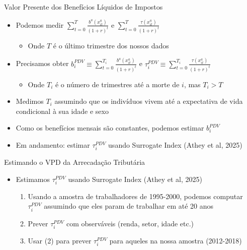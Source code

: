\begin{frame}[label=npv]{Valor Presente dos Benefícios Líquidos de Impostos}
    \begin{itemize}
        \item Podemos medir $\sum_{t=0}^{T} \frac{b^a(x_{it}^a)}{(1+r)^t}$ e $\sum_{t=0}^{T}  \frac{\tau(x_{it}^a)}{(1+r)^t}$
        \begin{itemize}
            \item Onde $T$ é o último trimestre dos nossos dados
        \end{itemize}
        \item Precisamos obter $b_i^{PDV}\equiv  \sum_{t=0}^{T_i} \frac{b^a(x_{it}^a)}{(1+r)^t}$ e $\tau_i^{PDV}\equiv  \sum_{t=0}^{T_i}  \frac{\tau(x_{it}^a)}{(1+r)^t}$
        \begin{itemize}
            \item Onde $T_i$ é o número de trimestres até a morte de $i$, mas $T_i>T$
        \end{itemize}
        \item Medimos $T_i$ assumindo que os indivíduos vivem até a expectativa de vida condicional à sua idade e sexo
        \item Como os benefícios mensais são constantes, podemos estimar $b_i^{PDV}$
        \item Em andamento: estimar $\tau_i^{PDV}$ usando Surrogate Index (Athey et al, 2025)
    \end{itemize}
\end{frame}

\begin{frame}[label=npvTaxes]{Estimando o VPD da Arrecadação Tributária}
    \begin{itemize}
        \item Estimamos $\tau_i^{PDV}$ usando Surrogate Index (Athey et al, 2025)
        \begin{enumerate}
            \item Usando a amostra de trabalhadores de 1995-2000, podemos computar $\tau^{PDV}_{i}$ assumindo que eles param de trabalhar em até 20 anos
            \item Prever $\tau^{PDV}_{i}$ com observáveis (renda, setor, idade etc.)
            \item Usar (2) para prever $\tau_i^{PDV}$ para aqueles na nossa amostra (2012-2018)
        \end{enumerate}
    \end{itemize}
\end{frame}

